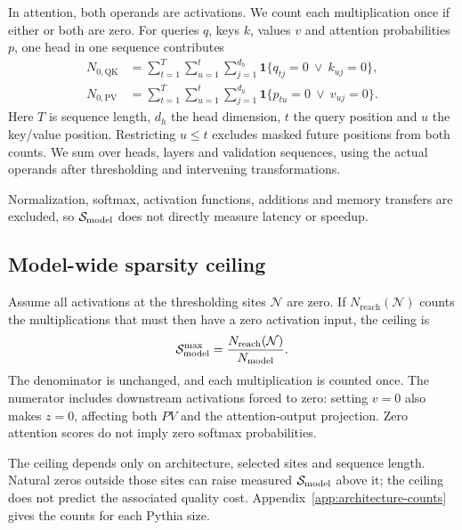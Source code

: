 In attention, both operands are activations. We count each multiplication
once if either or both are zero. For queries $q$, keys $k$, values $v$ and
attention probabilities $p$, one head in one sequence contributes
\begin{align}
N_{0,\mathrm{QK}}&=\sum_{t=1}^{T}\sum_{u=1}^{t}\sum_{j=1}^{d_h}
\mathbf{1}\{q_{tj}=0\ \lor\ k_{uj}=0\},\label{eq:qk-count}\\
N_{0,\mathrm{PV}}&=\sum_{t=1}^{T}\sum_{u=1}^{t}\sum_{j=1}^{d_h}
\mathbf{1}\{p_{tu}=0\ \lor\ v_{uj}=0\}.\label{eq:pv-count}
\end{align}
Here $T$ is sequence length, $d_h$ the head dimension, $t$ the query position
and $u$ the key/value position. Restricting $u\leq t$ excludes masked future
positions from both counts. We sum over heads, layers and validation sequences,
using the actual operands after thresholding and intervening transformations.

Normalization, softmax, activation functions, additions and memory transfers
are excluded, so $\mathcal{S}_{\mathrm{model}}$ does not directly measure latency or speedup.

\subsection{Model-wide sparsity ceiling}
\label{app:ceiling}

Assume all activations at the thresholding sites $\mathcal{N}$ are zero.
If $N_{\mathrm{reach}}(\mathcal{N})$ counts the multiplications that must
then have a zero activation input, the ceiling is
\begin{equation}
\mathcal{S}_{\mathrm{model}}^{\max}=\frac{N_{\mathrm{reach}}(\mathcal{N})}{N_{\mathrm{model}}}.
\end{equation}
The denominator is unchanged, and each multiplication is counted once.
The numerator includes downstream activations forced to zero: setting
$v=0$ also makes $z=0$, affecting both $PV$ and the attention-output projection.
Zero attention scores do not imply zero softmax probabilities.

The ceiling depends only on architecture, selected sites and sequence length.
Natural zeros outside those sites can raise measured $\mathcal{S}_{\mathrm{model}}$ above it;
the ceiling does not predict the associated quality cost.
Appendix~\ref{app:architecture-counts} gives the counts for each Pythia size.
